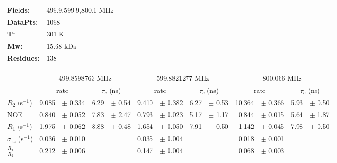 \documentclass[showkeys,aps,prb,prepreint,amssymb, amsmath,nobibnotes]{article}
\begin{document}
\begin{tabular}{ll}
\textbf{Fields:} &  499.9,599.9,800.1 MHz\\
\textbf{DataPts:} &  1098\\
 \textbf{T:} & 301 K\\
\textbf{Mw:} & 15.68 kDa\\
\textbf{Residues: } &   138\\
\end{tabular}

\begin{small}
\noindent \begin{tabular}{l|rlrl|rlrl|rlrl}
& \multicolumn{4}{c}{499.8598763 MHz}& \multicolumn{4}{c}{599.8821277 MHz}& \multicolumn{4}{c}{800.066 MHz}\\
&  \multicolumn{2}{c}{rate} & \multicolumn{2}{c}{$\tau_c$ (ns)}   &  \multicolumn{2}{c}{rate} & \multicolumn{2}{c}{$\tau_c$ (ns)}   &  \multicolumn{2}{c}{rate} & \multicolumn{2}{c}{$\tau_c$ (ns)}   \\
\hline$R_2$  (s$^{-1}$)  &  9.085 & $\pm$ 0.334   &  6.29 & $\pm$ 0.54 &  9.410 & $\pm$ 0.382   &  6.27 & $\pm$ 0.53 &  10.364 & $\pm$ 0.366   &  5.93 & $\pm$ 0.50 \\
NOE  &  0.840 & $\pm$ 0.052   &  7.83 & $\pm$ 2.47 &  0.793 & $\pm$ 0.023   &  5.17 & $\pm$ 1.17 &  0.844 & $\pm$ 0.015   &  5.64 & $\pm$ 1.87 \\
$R_1$ (s$^{-1}$)  &  1.975 & $\pm$ 0.062   &  8.88 & $\pm$ 0.48 &  1.654 & $\pm$ 0.050   &  7.91 & $\pm$ 0.50 &  1.142 & $\pm$ 0.045   &  7.98 & $\pm$ 0.50 \\
$\sigma_{zz}$  (s$^{-1}$)  &  0.036 & $\pm$ 0.010   & & &  0.035 & $\pm$ 0.004   & & &  0.018 & $\pm$ 0.001   & & \\
$\frac{R_1}{R_2}$  &  0.212 & $\pm$ 0.006   & & &  0.147 & $\pm$ 0.004   & & &  0.068 & $\pm$ 0.003   & & \\
\end{tabular}
\end{small}
\end{document}
